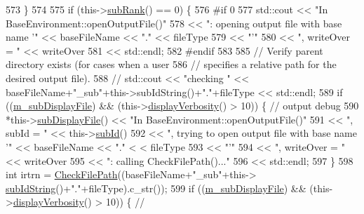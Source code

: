 \begin{DoxyCode}
573     \}
574 
575     \textcolor{keywordflow}{if} (this->\hyperlink{class_q_u_e_s_o_1_1_base_environment_a172d52f993f1322ed45aaddf71518dbb}{subRank}() == 0) \{
576 \textcolor{preprocessor}{#if 0}
577 \textcolor{preprocessor}{}      std::cout << \textcolor{stringliteral}{"In BaseEnvironment::openOutputFile()"}
578                 << \textcolor{stringliteral}{": opening output file with base name '"} << baseFileName << \textcolor{stringliteral}{"."} << fileType
579                 << \textcolor{stringliteral}{"'"}
580                 << \textcolor{stringliteral}{", writeOver = "} << writeOver
581                 << std::endl;
582 \textcolor{preprocessor}{#endif}
583 \textcolor{preprocessor}{}
585       \textcolor{comment}{// Verify parent directory exists (for cases when a user}
586       \textcolor{comment}{// specifies a relative path for the desired output file).}
588 \textcolor{comment}{}      \textcolor{comment}{// std::cout << "checking " << baseFileName+"\_sub"+this->subIdString()+"."+fileType << std::endl;}
589       \textcolor{keywordflow}{if} ((\hyperlink{class_q_u_e_s_o_1_1_base_environment_a52b4275aa8ee85994dd304d9fe95c9c5}{m\_subDisplayFile}) && (this->\hyperlink{class_q_u_e_s_o_1_1_base_environment_a1fe5f244fc0316a0ab3e37463f108b96}{displayVerbosity}() > 10)) \{ \textcolor{comment}{//
       output debug}
590         *this->\hyperlink{class_q_u_e_s_o_1_1_base_environment_a8a0064746ae8dddfece4229b9ad374d6}{subDisplayFile}() << \textcolor{stringliteral}{"In BaseEnvironment::openOutputFile()"}
591                                 << \textcolor{stringliteral}{", subId = "}     << this->\hyperlink{class_q_u_e_s_o_1_1_base_environment_a6ae3174897a9b3a4c85fa18da5d4c16f}{subId}()
592                                 << \textcolor{stringliteral}{", trying to open output file with base name '"} << baseFileName << \textcolor{stringliteral}{"."} <
      < fileType
593                                 << \textcolor{stringliteral}{"'"}
594                                 << \textcolor{stringliteral}{", writeOver = "} << writeOver
595                                 << \textcolor{stringliteral}{": calling CheckFilePath()..."} 
596                                 << std::endl;
597       \}
598       \textcolor{keywordtype}{int} irtrn = \hyperlink{namespace_q_u_e_s_o_abc55c11f68bb99c4eba88030f1164764}{CheckFilePath}((baseFileName+\textcolor{stringliteral}{"\_sub"}+this->
      \hyperlink{class_q_u_e_s_o_1_1_base_environment_a73f7849acdd5d5ba15a3094fe18f258f}{subIdString}()+\textcolor{stringliteral}{"."}+fileType).c\_str());
599       \textcolor{keywordflow}{if} ((\hyperlink{class_q_u_e_s_o_1_1_base_environment_a52b4275aa8ee85994dd304d9fe95c9c5}{m\_subDisplayFile}) && (this->\hyperlink{class_q_u_e_s_o_1_1_base_environment_a1fe5f244fc0316a0ab3e37463f108b96}{displayVerbosity}() > 10)) \{ \textcolor{comment}{//
}
\end{DoxyCode}
